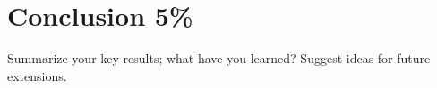 \section{Conclusion 5\%}
Summarize your key results; what have you learned? Suggest ideas for future extensions.